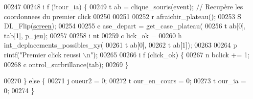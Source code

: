 \begin{DoxyCode}
00247 
00248                                                                                 \textcolor{keywordflow}{i
      f} (!tour\_ia) \{
00249                                                                                         t
      ab = clique\_souris(event); \textcolor{comment}{// Recupère les coordonnees du premier click}
00250 
00251 
00252                                                                                         r
      afraichir\_plateau();
00253                                                                                         S
      DL\_Flip(\hyperlink{fonction_interface_8h_a78fa3957d73de49cb81d047857504218}{screen});
00254 
00255                                                                                         c
      ase\_depart = get\_case\_plateau(
00256                                                                                                         t
      ab[0], tab[1], \hyperlink{moteur_8h_a3efa8d0f7c65daedc584dc8db048e62c}{p_jeu});
00257 
00258                                                                                         \textcolor{keywordtype}{i
      nt}
00259                                                                                                         c
      lick\_ok =
00260                                                                                                                         h
      int\_deplacements\_possibles\_xy(
00261                                                                                                                                         t
      ab[0],
00262                                                                                                                                         t
      ab[1]);
00263 
00264                                                                                         p
      rintf(\textcolor{stringliteral}{"Premier click reussi \(\backslash\)n"});
00265 
00266                                                                                         \textcolor{keywordflow}{i
      f} (click\_ok) \{
00267                                                                                                 n
      bclick += 1;
00268                                                                                                 c
      ontrol\_surbrillance(tab);
00269                                                                                         \}
      
00270                                                                                 \}
       \textcolor{keywordflow}{else} \{
00271                                                                                         j
      oueur2 = 0;
00272                                                                                         t
      our\_en\_cours = 0;
00273                                                                                         t
      our\_ia = 0;
00274                                                                                 \}
      

\end{DoxyCode}
